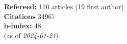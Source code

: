 \textbf{Refereed:} 110 articles (19 first author)\\\textbf{Citations} 34967\\\textbf{h-index:} 48\\(as of \textit{2024-01-21})